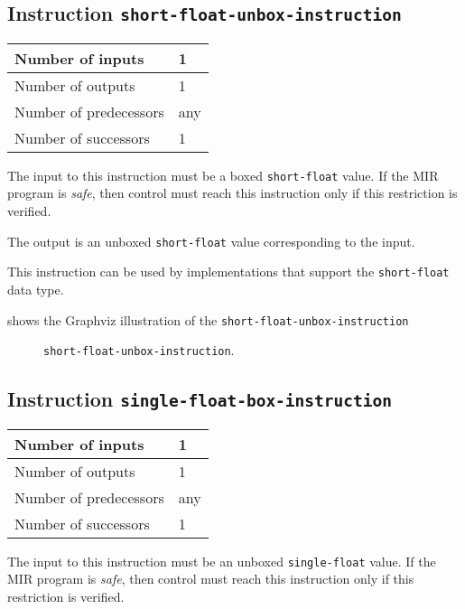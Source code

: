 \subsection{Instruction \texttt{short-float-unbox-instruction}}
\label{mir-instruction-short-float-unbox}

\begin{tabular}{|l|l|}
\hline
Number of inputs & 1\\
\hline
Number of outputs & 1\\
\hline
Number of predecessors & any\\
\hline
Number of successors & 1\\
\hline
\end{tabular}

The input to this instruction must be a boxed \texttt{short-float}
value.  If the MIR program is \emph{safe}, then control must reach
this instruction only if this restriction is verified.

The output is an unboxed \texttt{short-float} value corresponding to
the input.

This instruction can be used by implementations that support the
\texttt{short-float} data type.   

 shows the Graphviz illustration of the
\texttt{short-float-unbox-instruction}

\begin{figure}
\begin{center}
\end{center}
\caption{\label{fig-short-float-unbox-instruction}
\texttt{short-float-unbox-instruction}.}
\end{figure}

\subsection{Instruction \texttt{single-float-box-instruction}}
\label{mir-instruction-single-float-box}

\begin{tabular}{|l|l|}
\hline
Number of inputs & 1\\
\hline
Number of outputs & 1\\
\hline
Number of predecessors & any\\
\hline
Number of successors & 1\\
\hline
\end{tabular}

The input to this instruction must be an unboxed \texttt{single-float}
value.  If the MIR program is \emph{safe}, then control must reach
this instruction only if this restriction is verified.

